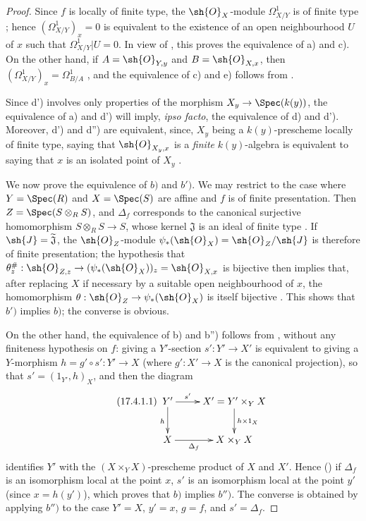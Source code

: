 \begin{proof}
Since $f$ is locally of finite type, the $\sh{O}_X$-module $\Omega^1_{X/Y}$ is of finite type ; hence $(\Omega^1_{X/Y})_x=0$ is equivalent to the existence of an open neighbourhood $U$ of $x$ such that $\Omega^1_{X/Y}|U=0$.
In view of , this proves the equivalence of a) and c).
On the other hand, if $A=\sh{O}_{Y,y}$ and $B=\sh{O}_{X,x}$, then $(\Omega^1_{X/Y})_x=\Omega^1_{B/A}$ , and the equivalence of c) and e) follows from .

Since d') involves only properties of the morphism $X_y\to\Spec(k(y))$, the equivalence of a) and d') will imply, \emph{ipso facto}, the equivalence of d) and d').
Moreover, d') and d'') are equivalent, since, $X_y$ being a $k(y)$-prescheme locally of finite type, saying that $\sh{O}_{X_y,x}$ is a \emph{finite} $k(y)$-algebra is equivalent to saying that $x$ is an isolated point of $X_y$ .

We now prove the equivalence of $b)$ and $b')$.
We may restrict to the case where $Y=\Spec(R)$ and $X=\Spec(S)$ are affine and $f$ is of finite presentation. Then $Z=\Spec(S\otimes_R S)$, and $\Delta_f$ corresponds to the canonical surjective homomorphism $S\otimes_R S\to S$, whose kernel $\mathfrak{J}$ is an ideal of finite type . If $\sh{J}=\widetilde{\mathfrak{J}}$, the $\sh{O}_Z$-module $\psi_*(\sh{O}_X)=\sh{O}_Z/\sh{J}$ is therefore of finite presentation; the hypothesis that $\theta_z^\#:\sh{O}_{Z,z}\to(\psi_*(\sh{O}_X))_z=\sh{O}_{X,x}$ is bijective then implies that, after replacing $X$ if necessary by a suitable open neighbourhood of $x$, the homomorphism $\theta:\sh{O}_Z\to\psi_*(\sh{O}_X)$ is itself bijective .
This shows that $b')$ implies $b)$; the converse is obvious.

On the other hand, the equivalence of b) and b'') follows from , without any finiteness hypothesis on $f$: giving a $Y'$-section $s':Y'\to X'$ is equivalent to giving a
$Y$-morphism $h=g'\circ s':Y'\to X$ (where $g':X'\to X$ is the canonical projection), so that $s'=(1_{Y'},h)_X$, and then the diagram
\[
\tag{17.4.1.1}
\label{IV.17.4.1.1}
\xymatrix{
Y' \ar[r]^-{s'} \ar[d]_h & X'=Y'\times_Y X \ar[d]^{h\times 1_X}\\
X \ar[r]_-{\Delta_f} & X\times_Y X
}
\]
identifies $Y'$ with the $(X\times_Y X)$-prescheme product of $X$ and $X'$.
Hence () if $\Delta_f$ is an isomorphism local at the point $x$, $s'$ is an isomorphism local at the point $y'$ (since $x=h(y')$), which proves that $b)$ implies $b'')$.
The converse is obtained by applying $b'')$ to the case $Y'=X$, $y'=x$, $g=f$, and $s'=\Delta_f$.


\end{proof}
